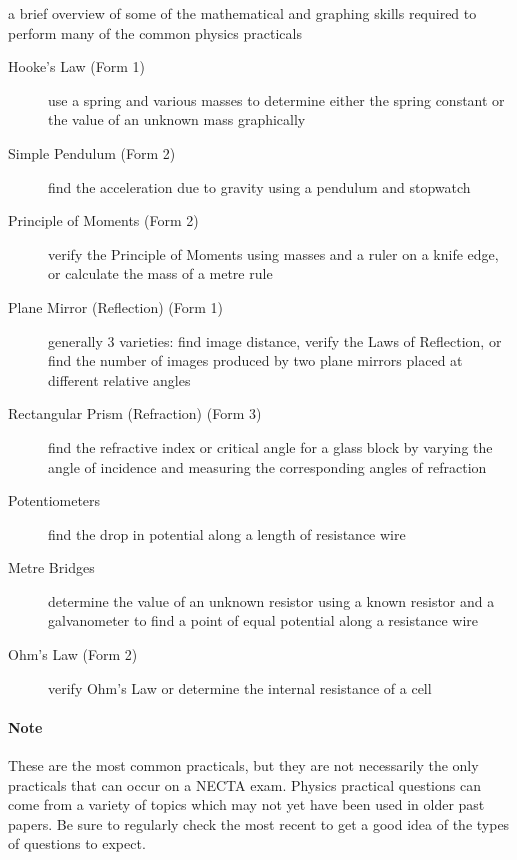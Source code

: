 \begin{description} \itemsep1pt \parskip0pt 
\item[Mathematics]{a brief overview of some of the mathematical and graphing skills required to perform many of the common physics practicals}
\item[Mechanics] \hfill 
\begin{description} 
\item[Hooke's Law (Form 1)]{use a spring and various masses to determine either the spring constant or the value of an unknown mass graphically}
\item[Simple Pendulum (Form 2)]{find the acceleration due to gravity using a pendulum and stopwatch}
\item[Principle of Moments (Form 2)]{verify the Principle of Moments using masses and a ruler on a knife edge, or calculate the mass of a metre rule}
\end{description}
\item[Light] \hfill 
\begin{description}
\item[Plane Mirror (Reflection) (Form 1)]{generally 3 varieties: find image distance, verify the Laws of Reflection, or find the number of images produced by two plane mirrors placed at different relative angles}
\item[Rectangular Prism (Refraction) (Form 3)]{find the refractive index or critical angle for a glass block by varying the angle of incidence and measuring the corresponding angles of refraction}
\end{description}
\item[Electricity] \hfill 
\begin{description} 
\item[Potentiometers]{find the drop in potential along a length of resistance wire}
\item[Metre Bridges]{determine the value of an unknown resistor using a known resistor and a galvanometer to find a point of equal potential along a resistance wire}
\item[Ohm's Law (Form 2)]{verify Ohm's Law or determine the internal resistance of a cell}
\end{description}
\end{description}

\paragraph{Note} These are the most common practicals, but they are not necessarily the only practicals that can occur on a NECTA exam. Physics practical questions can come from a variety of topics which may not yet have been used in older past papers. Be sure to regularly check the most recent  to get a good idea of the types of questions to expect. 

